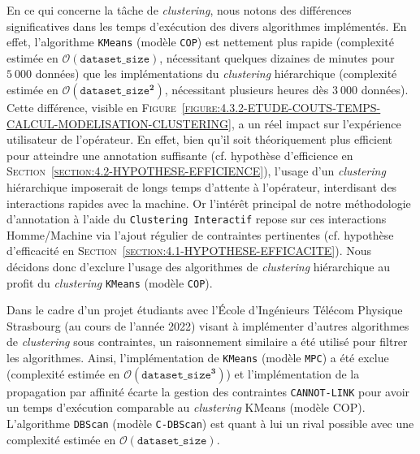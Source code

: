 			En ce qui concerne la tâche de \textit{clustering}, nous notons des différences significatives dans les temps d'exécution des divers algorithmes implémentés.
			En effet, l'algorithme \texttt{KMeans} (modèle \texttt{COP}) est nettement plus rapide (complexité estimée en $ \mathcal{O}(\texttt{dataset\_size}) $, nécessitant quelques dizaines de minutes pour $5~000$ données) que les implémentations du \textit{clustering} hiérarchique (complexité estimée en $ \mathcal{O}(\texttt{dataset\_size}^{\textbf{2}}) $, nécessitant plusieurs heures dès $3~000$ données).
			Cette différence, visible en \textsc{Figure~\ref{figure:4.3.2-ETUDE-COUTS-TEMPS-CALCUL-MODELISATION-CLUSTERING}}, a un réel impact sur l'expérience utilisateur de l'opérateur.
			En effet, bien qu'il soit théoriquement plus efficient pour atteindre une annotation suffisante (cf. hypothèse d'efficience en \textsc{Section~\ref{section:4.2-HYPOTHESE-EFFICIENCE}}), l'usage d'un \textit{clustering} hiérarchique imposerait de longs temps d'attente à l'opérateur, interdisant des interactions rapides avec la machine.
			Or l'intérêt principal de notre méthodologie d'annotation à l'aide du \texttt{Clustering Interactif} repose sur ces interactions Homme/Machine via l'ajout régulier de contraintes pertinentes (cf. hypothèse d'efficacité en \textsc{Section~\ref{section:4.1-HYPOTHESE-EFFICACITE}}).
			Nous décidons donc d'exclure l'usage des algorithmes de \textit{clustering} hiérarchique au profit du \textit{clustering} \texttt{KMeans} (modèle \texttt{COP}).
			
			\begin{leftBarInformation}
				Dans le cadre d'un projet étudiants avec l'École d'Ingénieurs Télécom Physique Strasbourg (au cours de l'année 2022) visant à implémenter d'autres algorithmes de \textit{clustering} sous contraintes, un raisonnement similaire a été utilisé pour filtrer les algorithmes.
				Ainsi, l'implémentation de \texttt{KMeans} (modèle \texttt{MPC}) a été exclue (complexité estimée en $ \mathcal{O}(\texttt{dataset\_size}^{\textbf{3}}) $) et l'implémentation de la propagation par affinité écarte la gestion des contraintes \texttt{CANNOT-LINK} pour avoir un temps d'exécution comparable au \textit{clustering} KMeans (modèle COP).
				L'algorithme \texttt{DBScan} (modèle \texttt{C-DBScan}) est quant à lui un rival possible avec une complexité estimée en $ \mathcal{O}(\texttt{dataset\_size}) $.
			\end{leftBarInformation}
			
